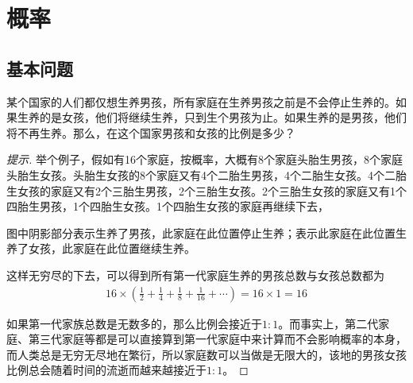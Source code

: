 
\chapter{概率}
\label{chap:probability}

\section{基本问题}
\label{sec:basic-probability-problems}

\begin{example}
  某个国家的人们都仅想生养男孩，所有家庭在生养男孩之前是不会停止生养的。如果生养的是女孩，他们将继续生养，只到生个男孩为止。如果生养的是男孩，他们将不再生养。那么，在这个国家男孩和女孩的比例是多少？
\end{example}
\begin{proof}[提示]
  举个例子，假如有16个家庭，按概率，大概有8个家庭头胎生男孩，8个家庭头胎生女孩。头胎生女孩的8个家庭又有4个二胎生男孩，4个二胎生女孩。4个二胎生女孩的家庭又有2个三胎生男孩，2个三胎生女孩。2个三胎生女孩的家庭又有1个四胎生男孩，1个四胎生女孩。1个四胎生女孩的家庭再继续下去，

  \begin{center}
  \end{center}
  图中阴影部分表示生养了男孩，此家庭在此位置停止生养；表示此家庭在此位置生养了女孩，此家庭在此位置继续生养。

  这样无穷尽的下去，可以得到所有第一代家庭生养的男孩总数与女孩总数都为
  \begin{align*}
    16\times\left(\frac12 + \frac14 + \frac18 + \frac1{16}+\cdots\right)=16\times 1 = 16
  \end{align*}

  如果第一代家族总数是无数多的，那么比例会接近于$1:1$。而事实上，第二代家庭、第三代家庭等都是可以直接算到第一代家庭中来计算而不会影响概率的本身，而人类总是无穷无尽地在繁衍，所以家庭数可以当做是无限大的，该地的男孩女孩比例总会随着时间的流逝而越来越接近于$1:1$。
\end{proof}


